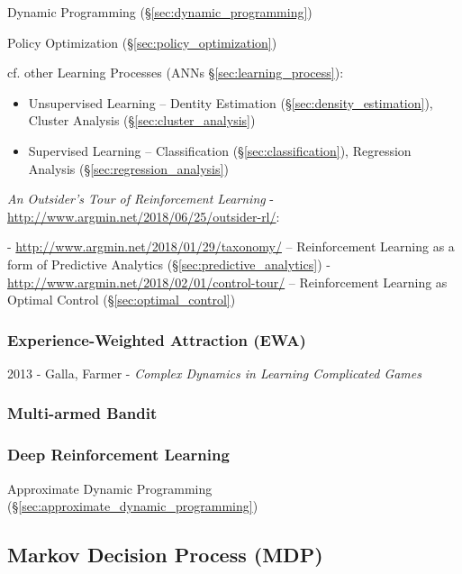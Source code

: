 Dynamic Programming (\S\ref{sec:dynamic_programming})

Policy Optimization (\S\ref{sec:policy_optimization})

cf. other Learning Processes (ANNs \S\ref{sec:learning_process}):
\begin{itemize}
  \item Unsupervised Learning -- Dentity Estimation
    (\S\ref{sec:density_estimation}), Cluster Analysis
    (\S\ref{sec:cluster_analysis})
  \item Supervised Learning -- Classification (\S\ref{sec:classification}),
    Regression Analysis (\S\ref{sec:regression_analysis})
\end{itemize}

\emph{An Outsider's Tour of Reinforcement Learning} -
\url{http://www.argmin.net/2018/06/25/outsider-rl/}:

- \url{http://www.argmin.net/2018/01/29/taxonomy/} --
  Reinforcement Learning as a form of Predictive Analytics
  (\S\ref{sec:predictive_analytics})
- \url{http://www.argmin.net/2018/02/01/control-tour/} --
  Reinforcement Learning as Optimal Control (\S\ref{sec:optimal_control})



\subsubsection{Experience-Weighted Attraction (EWA)}\label{sec:ewa}

2013 - Galla, Farmer - \emph{Complex Dynamics in Learning Complicated Games}



\subsubsection{Multi-armed Bandit}\label{sec:multiarmed_bandit}

\subsubsection{Deep Reinforcement Learning}\label{sec:deep_rl}

\fist Approximate Dynamic Programming
(\S\ref{sec:approximate_dynamic_programming})



\subsection{Markov Decision Process (MDP)}\label{sec:mdp}

